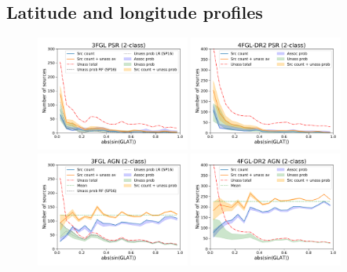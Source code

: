 \documentclass[referee]{aa} %
\newcommand{\lb}{\label}
\begin{document}
\subsection{Latitude and longitude profiles}
\lb{sec:lat-lon-profiles}

\begin{figure}[h]
\centering
\includegraphics[width=0.45\textwidth]{plots/lat_profile_PSR_3FGL_2classes.pdf}
\includegraphics[width=0.45\textwidth]{plots/lat_profile_PSR_4FGL-DR2_2classes.pdf} \\
\includegraphics[width=0.45\textwidth]{plots/lat_profile_AGN_3FGL_2classes.pdf}
\includegraphics[width=0.45\textwidth]{plots/lat_profile_AGN_4FGL-DR2_2classes.pdf}

\end{figure}
\end{document}
